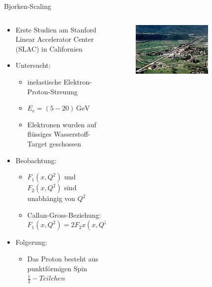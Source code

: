 \documentclass[aspectratio=1610, 9pt]{beamer}
\begin{document}
\begin{frame}{Bjorken-Scaling}
  \begin{columns}
    \begin{column}{0.4\textwidth}
      \begin{itemize}
        \item{Erste Studien am Stanford Linear Accelerator Center (SLAC) in Californien}
        \item{Untersucht:}
        \begin{itemize}
          \item {inelastische Elektron-Proton-Streuung}
          \item {$E_\text{e} = (5 - 20) \,\mathrm{GeV} $}
          \item {Elektronen wurden auf flüssiges Wasserstoff-Target geschossen}
        \end{itemize}
        \item{Beobachtung:}
        \begin{itemize}
          \item {$F_1(x, Q^2)$ und $F_2(x, Q^2)$ sind unabhängig von $Q^2$}
          \item {Callan-Gross-Beziehung: $F_1(x, Q^2) = 2 F_2 x (x, Q^2)$}
        \end{itemize}
        \item{Folgerung:}
        \begin{itemize}
          \item {Das Proton besteht aus punktförmigen Spin $\frac{1}{2}-Teilchen $ }
        \end{itemize}
      \end{itemize}
    \end{column}
    \begin{column}{0.6\textwidth}
      \begin{figure}
        \centering
        \includegraphics[width=0.75\textwidth]{images/ariel2.jpg}
      \end{figure}
    \end{column}
  \end{columns}
    
\end{frame}
\end{document}
